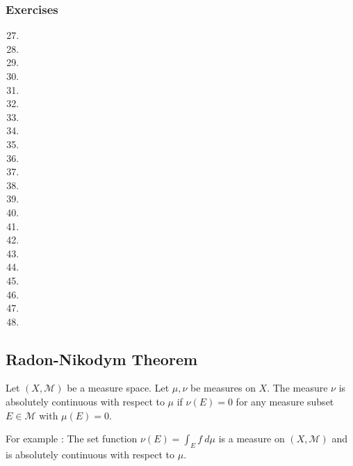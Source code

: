 \subsubsection{Exercises}
\begin{enumerate}
	\setcounter{enumi}{26}
	\item
	\item
	\item
	\item
	\item
	\item
	\item
	\item
	\item
	\item
	\item
	\item
	\item
	\item
	\item
	\item
	\item
	\item
	\item
	\item
	\item
	\item
\end{enumerate}

\subsection{Radon-Nikodym Theorem}
\begin{definition}
	Let $(X,\mathcal{M})$ be a measure space.
	Let $\mu,\nu$ be measures on $X$.
	The measure $\nu$ is absolutely continuous with respect to $\mu$ if $\nu(E) = 0$ for any measure subset $E \in \mathcal{M}$ with $\mu(E) = 0$.
\end{definition}
	For example : The set function $\nu(E) = \displaystyle \int_E f \ d\mu$ is a measure on $(X,\mathcal{M})$ and is absolutely continuous with respect to $\mu$.

